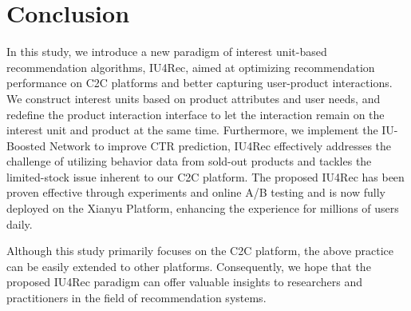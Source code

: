 \section{Conclusion}
In this study, we introduce a new paradigm of interest unit-based recommendation algorithms, IU4Rec, aimed at optimizing recommendation performance on C2C platforms and better capturing user-product interactions. 
We construct interest units based on product attributes and user needs, and redefine the product interaction interface to let the interaction remain on the interest unit and product at the same time. Furthermore, we implement the IU-Boosted Network to improve CTR prediction, IU4Rec effectively addresses the challenge of utilizing behavior data from sold-out products and tackles the limited-stock issue inherent to our C2C platform.
The proposed IU4Rec has been proven effective through experiments and online A/B testing and is now fully deployed on the Xianyu Platform, enhancing the experience for millions of users daily.

Although this study primarily focuses on the C2C platform, the above practice can be easily extended to other platforms. Consequently, we hope that the proposed IU4Rec paradigm can offer valuable insights to researchers and practitioners in the field of recommendation systems.